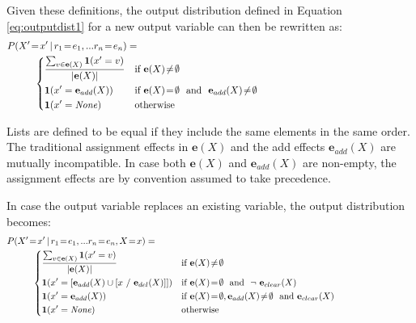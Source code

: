 Given these definitions, the output distribution defined in Equation \eqref{eq:outputdist1} for a new output variable can then be rewritten as: 
\begin{align}
&P(X'\!=\!x' \, | \, r_1\!=\!e_1,... r_n\!=\!e_n) = \hspace{10cm} \nonumber \\ & \; \; \; \; \;\; \; \; \; \; \begin{dcases} 
\frac{\sum_{v \in {\mathbf{e}(X)}} \mathbf{1}(x' = v)} { |\mathbf{e}(X)| }&  \text{if } \mathbf{e}(X)\!\neq\!\emptyset \\
\mathbf{1}(x' = \mathbf{e}_{add}(X))  &  \text{if } \mathbf{e}(X)\!=\!\emptyset \ \text{ and } \ \mathbf{e}_{add}(X)\!\neq\!\emptyset \\
\mathbf{1}(x' = \mathit{None}) & \text{otherwise}
\end{dcases}\label{eq:outputdist3}
\end{align}

Lists are defined to be equal if they include the same elements in the same order. The traditional assignment effects in $\mathbf{e}(X)$ and the add effects $\mathbf{e}_{add}(X)$ are mutually incompatible. In case both $\mathbf{e}(X)$ and $\mathbf{e}_{add}(X)$ are non-empty, the assignment effects are by convention assumed to take precedence. 

In case the output variable replaces an existing variable, the output distribution becomes:
\begin{align}
&P(X'\!=\!x' \, | \, r_1\!=\!e_1,... r_n\!=\!e_n, X\!=\!x) = \hspace{10cm} \nonumber \\ & \; \; \; \; \; \; \; \; \; \;  \begin{dcases} 
\frac{\sum_{v \in {\mathbf{e}(X)}} \mathbf{1}(x' = v)} { |\mathbf{e}(X)| }  & \text{if } \mathbf{e}(X)\!\neq\!\emptyset \\
\mathbf{1}(x' = \left[\mathbf{e}_{add}(X) \cup \left[x \ / \ \mathbf{e}_{del}(X)\right]\right]) & \text{if } \mathbf{e}(X)\!=\!\emptyset \ \text{ and } \ \neg \ \mathbf{e}_{clear}(X) \\
\mathbf{1}(x' = \mathbf{e}_{add}(X))  &  \text{if } \mathbf{e}(X)\!=\!\emptyset, \mathbf{e}_{add}(X)\!\neq\!\emptyset \ \text{ and }  \mathbf{e}_{clear}(X) \\
\mathbf{1}(x' = \mathit{None}) & \text{otherwise}
\end{dcases}\label{eq:outputdist4}
\end{align}


